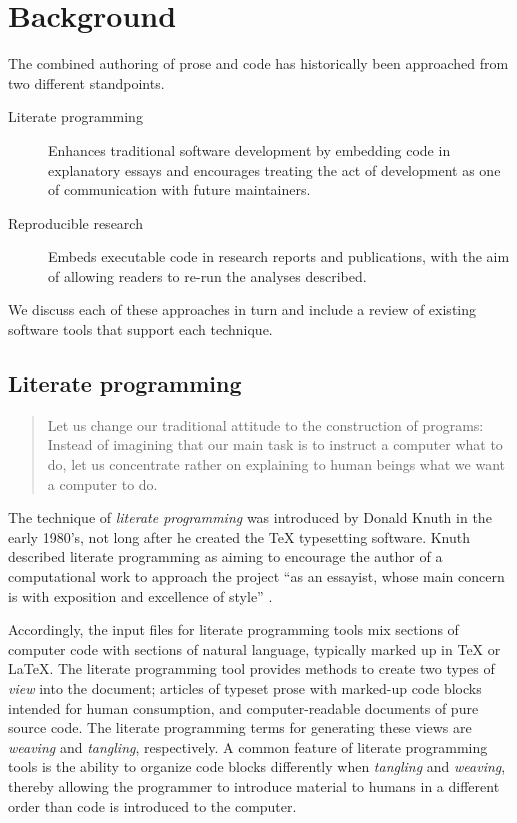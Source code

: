 \documentclass[article,shortnames]{jss}
\begin{document}
\section{Background}
\label{sec-2}
\label{background}

The combined authoring of prose and code has historically been
approached from two different standpoints.

\begin{description}
\item[Literate programming] Enhances traditional software development by
     embedding code in explanatory essays and encourages treating the
     act of development as one of communication with future
     maintainers.
\item[Reproducible research] Embeds executable code in research reports
     and publications, with the aim of allowing readers to re-run the
     analyses described.
\end{description}

We discuss each of these approaches in turn and include a review of
existing software tools that support each technique.
\subsection{Literate programming}
\label{sec-2-1}

\begin{quote}
Let us change our traditional attitude to the construction of
programs: Instead of imagining that our main task is to instruct a
computer what to do, let us concentrate rather on explaining to human
beings what we want a computer to do.

\end{quote}

The technique of \emph{literate programming} was introduced by Donald Knuth
in the early 1980's, not long after he created the \TeX{} typesetting
software.  Knuth described literate programming as aiming to encourage
the author of a computational work to approach the project ``as an
essayist, whose main concern is with exposition and excellence of
style'' \citep{web}.

Accordingly, the input files for literate programming tools mix
sections of computer code with sections of natural language, typically
marked up in \TeX{} or \LaTeX{}.  The literate programming tool provides
methods to create two types of \emph{view} into the document; articles of
typeset prose with marked-up code blocks intended for human consumption,
and computer-readable documents of pure source code.  The literate
programming terms for generating these views are \emph{weaving} and
\emph{tangling}, respectively.  A common feature of literate programming
tools is the ability to organize code blocks differently when
\emph{tangling} and \emph{weaving}, thereby allowing the programmer to introduce
material to humans in a different order than code is introduced to the
computer.
\end{document}
